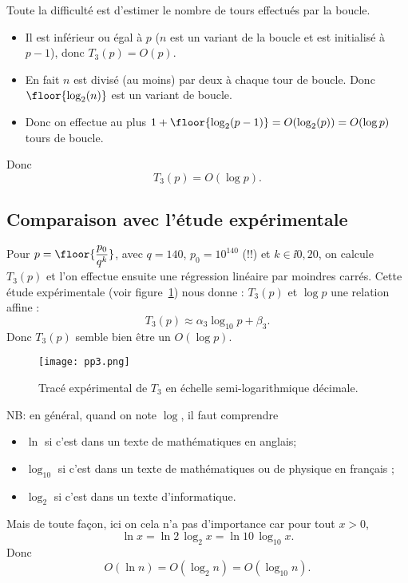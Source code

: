 Toute la difficulté est d'estimer le nombre de tours effectués par la
boucle.
\begin{itemize}
\item[\textbullet] Il est inférieur ou égal à $p$ ($n$ est un variant de la
  boucle et est initialisé à $p-1$), donc $T_{3}(p)=O(p)$.
\item[\textbullet] En fait $n$
  est divisé (au moins) par deux à chaque tour de boucle. Donc
  $\floor{\log_{2}(n)}$ est un variant de boucle.
\item[\textbullet] Donc on effectue au
  plus $1+ \floor{\log_{2}(p-1)} = O(\log_{2}(p)) = O(\log p)$ tours de boucle.
\end{itemize}
Donc
\begin{equation*}
  T_{3}(p) = O(\log p).
\end{equation*}

\subsection{Comparaison avec l'étude expérimentale}

Pour $p = \floor{\dfrac{p_0}{q^k}}$, avec $q = 140$, $p_0 = 10^{140}$ (!!) et $k\in\ii{0,20}$, on calcule $T_3(p)$ et l'on effectue ensuite une régression linéaire par moindres carrés. Cette étude expérimentale (voir figure~\ref{fig.pp3}) nous donne :
$T_{3}(p)$ et $\log p$ une relation affine :
\begin{equation*}
  T_{3}(p) \approx \alpha_{3}\log_{10} p + \beta_{3}.
\end{equation*}
Donc $T_{3}(p)$ semble bien être un $O(\log p)$.

\begin{figure}[!h]
  \begin{center}
    \texttt{[image: pp3.png]}
    \caption{Tracé expérimental de $T_3$ en échelle semi-logarithmique décimale.}
    \label{fig.pp3}
  \end{center}
\end{figure}

NB: en général, quand on note $\log$, il faut comprendre
\begin{itemize}
\item $\ln$ si c'est dans un texte de mathématiques en anglais;
\item $\log_{10}$ si c'est dans un texte de mathématiques ou de
  physique en français ;
\item $\log_{2}$ si c'est dans un texte d'informatique.
\end{itemize}
Mais de toute façon, ici on cela n'a pas d'importance car pour tout $x>0$,
\begin{equation*}
 \ln x = \ln 2 \, \log_{2} x = \ln 10\, \log_{10}x.
\end{equation*}
Donc
\begin{equation*}
  O(\ln n) = O(\log_{2} n) = O(\log_{10} n).
\end{equation*}
 

